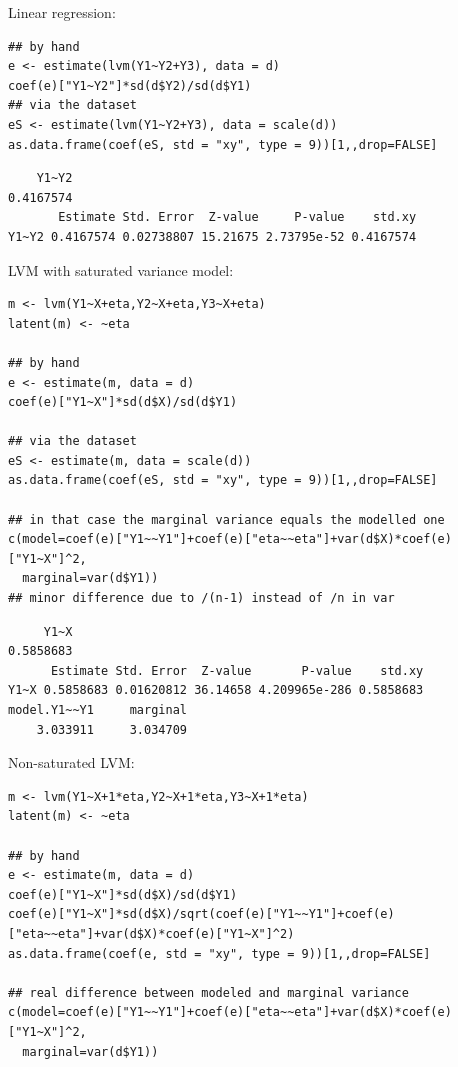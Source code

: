\documentclass{article}
\begin{document}
Linear regression:
\lstset{language=r,label= ,caption= ,captionpos=b,numbers=none}
\begin{lstlisting}
## by hand
e <- estimate(lvm(Y1~Y2+Y3), data = d)
coef(e)["Y1~Y2"]*sd(d$Y2)/sd(d$Y1)
## via the dataset
eS <- estimate(lvm(Y1~Y2+Y3), data = scale(d))
as.data.frame(coef(eS, std = "xy", type = 9))[1,,drop=FALSE]
\end{lstlisting}

\begin{verbatim}
    Y1~Y2 
0.4167574
       Estimate Std. Error  Z-value     P-value    std.xy
Y1~Y2 0.4167574 0.02738807 15.21675 2.73795e-52 0.4167574
\end{verbatim}

LVM with saturated variance model:
\lstset{language=r,label= ,caption= ,captionpos=b,numbers=none}
\begin{lstlisting}
m <- lvm(Y1~X+eta,Y2~X+eta,Y3~X+eta)
latent(m) <- ~eta

## by hand
e <- estimate(m, data = d)
coef(e)["Y1~X"]*sd(d$X)/sd(d$Y1)

## via the dataset
eS <- estimate(m, data = scale(d))
as.data.frame(coef(eS, std = "xy", type = 9))[1,,drop=FALSE]

## in that case the marginal variance equals the modelled one
c(model=coef(e)["Y1~~Y1"]+coef(e)["eta~~eta"]+var(d$X)*coef(e)["Y1~X"]^2,
  marginal=var(d$Y1))
## minor difference due to /(n-1) instead of /n in var
\end{lstlisting}

\begin{verbatim}
     Y1~X 
0.5858683
      Estimate Std. Error  Z-value       P-value    std.xy
Y1~X 0.5858683 0.01620812 36.14658 4.209965e-286 0.5858683
model.Y1~~Y1     marginal 
    3.033911     3.034709
\end{verbatim}

Non-saturated LVM:
\lstset{language=r,label= ,caption= ,captionpos=b,numbers=none}
\begin{lstlisting}
m <- lvm(Y1~X+1*eta,Y2~X+1*eta,Y3~X+1*eta)
latent(m) <- ~eta

## by hand
e <- estimate(m, data = d)
coef(e)["Y1~X"]*sd(d$X)/sd(d$Y1)
coef(e)["Y1~X"]*sd(d$X)/sqrt(coef(e)["Y1~~Y1"]+coef(e)["eta~~eta"]+var(d$X)*coef(e)["Y1~X"]^2)
as.data.frame(coef(e, std = "xy", type = 9))[1,,drop=FALSE]

## real difference between modeled and marginal variance
c(model=coef(e)["Y1~~Y1"]+coef(e)["eta~~eta"]+var(d$X)*coef(e)["Y1~X"]^2,
  marginal=var(d$Y1))
\end{lstlisting}
\end{document}
